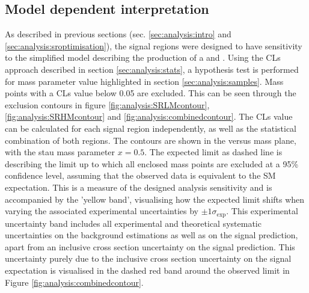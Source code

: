 \subsection{Model dependent interpretation}
As described in previous sections (sec.  \ref{sec:analysis:intro} and \ref{sec:analysis:sroptimisation}), the signal regions were designed to have sensitivity to the simplified model describing the production of a \Cone and \Ntwo .  Using the CLs approach described in section \ref{sec:analysis:stats},  a hypothesis test is performed for mass parameter value highlighted in section \ref{sec:analysis:samples}.  Mass points with a CLs value below 0.05 are excluded.  This can be seen through the exclusion contours in figure \ref{fig:analysis:SRLMcontour}, \ref{fig:analysis:SRHMcontour} and \ref{fig:analysis:combinedcontour}.  The CLs value can be calculated for each signal region independently, as well as the statistical combination of both regions. 
The contours are shown in the \None versus \Cone mass plane,  with the stau mass parameter $x=0.5$. The expected limit as dashed line is describing the limit up to which all enclosed mass points are excluded at a 95\% confidence level,  assuming that the observed data is equivalent to the \ac{SM} expectation.  This is a measure of the designed analysis sensitivity and is accompanied by the 'yellow band', visualising how the expected limit shifts when varying the associated experimental uncertainties by $\pm 1 \sigma_{\text{exp}}$.  This experimental uncertainty band includes all experimental and theoretical systematic uncertainties on the background estimations as well as on the signal prediction,  apart from an inclusive cross section uncertainty on the signal prediction. 
This uncertainty purely due to the inclusive cross section uncertainty on the signal expectation is visualised in the dashed red band around the observed limit in Figure \ref{fig:analysis:combinedcontour}. 
 
